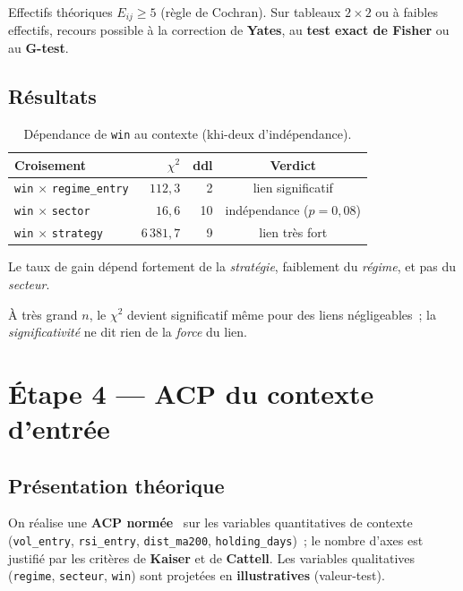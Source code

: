 \begin{conditions}
Effectifs théoriques \(E_{ij}\ge 5\) (règle de Cochran). Sur tableaux
\(2\times2\) ou à faibles effectifs, recours possible à la correction de
\textbf{Yates}, au \textbf{test exact de Fisher} ou au \textbf{G-test}.
\end{conditions}

\subsection{Résultats}
\begin{table}[H]
\centering
\caption{Dépendance de \texttt{win} au contexte (khi-deux d'indépendance).}
\label{tab:b1-etape3}
\small
\begin{tabular}{@{}lrrc@{}}
\toprule
Croisement & $\chi^2$ & ddl & Verdict \\
\midrule
\texttt{win} $\times$ \texttt{regime\_entry} & $112{,}3$   & 2  & lien significatif \\
\texttt{win} $\times$ \texttt{sector}        & $16{,}6$    & 10 & indépendance ($p=0{,}08$) \\
\texttt{win} $\times$ \texttt{strategy}      & $6\,381{,}7$& 9  & lien très fort \\
\bottomrule
\end{tabular}
\end{table}

Le taux de gain dépend fortement de la \emph{stratégie}, faiblement du
\emph{régime}, et pas du \emph{secteur}.

\begin{limites}
À très grand \(n\), le \(\chi^2\) devient significatif même pour des
liens négligeables~; la \emph{significativité} ne dit rien de la
\emph{force} du lien. %
\end{limites}

\section{Étape 4 --- ACP du contexte d'entrée}
\label{sec:b1-etape4}

\subsection{Présentation théorique}
On réalise une \textbf{ACP normée}~\cite{saporta2006,lebart2006} sur les
variables quantitatives de contexte (\texttt{vol\_entry},
\texttt{rsi\_entry}, \texttt{dist\_ma200},
\texttt{holding\_days})~; le nombre d'axes est justifié par les critères
de \textbf{Kaiser} et de \textbf{Cattell}. Les variables qualitatives
(\texttt{regime}, \texttt{secteur}, \texttt{win}) sont projetées en
\textbf{illustratives} (valeur-test).

